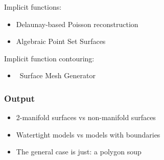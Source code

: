 Implicit functions:

\begin{itemize}
\item Delaunay-based Poisson reconstruction \cite{Kazhdan06}
\item Algebraic Point Set Surfaces \cite{Guennebaud07}
\end{itemize}

Implicit function contouring:

\begin{itemize}
\item \cgal\ Surface Mesh Generator~\cite{cgal:ry-gsddrm-06,cgal:bo-pgsms-05}
\end{itemize}


\subsubsection{Output}

\begin{itemize}
\item 2-manifold surfaces vs non-manifold surfaces
\item Watertight models vs models with boundaries
\item The general case is just: a polygon soup
\end{itemize}


